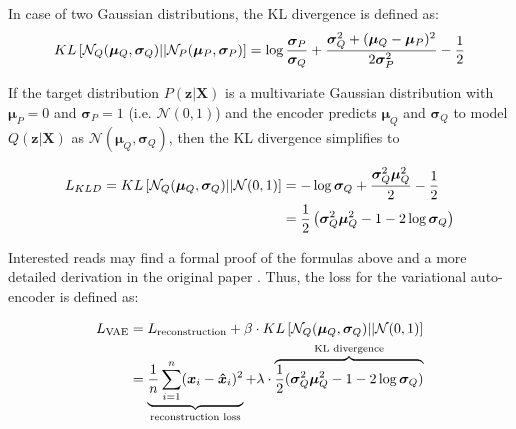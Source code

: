 In case of two Gaussian distributions, the KL divergence is defined as:
\begin{equation}\eqlbl{hso_4}
	KL\left[ \mathcal{N}_Q(\boldsymbol{\mu}_Q, \boldsymbol{\sigma}_Q)||\mathcal{N}_P(\boldsymbol{\mu}_P, \boldsymbol{\sigma}_P) \right] = \log \frac{\boldsymbol{\sigma}_P}{\boldsymbol{\sigma}_Q} + \frac{\boldsymbol{\sigma}_Q^2 + (\boldsymbol{\mu}_Q-\boldsymbol{\mu}_P)^2}{2\boldsymbol{\sigma}_P^2} - \frac{1}{2}
\end{equation}


If the target distribution $P(\boldsymbol{z}|\boldsymbol{X})$ is a multivariate Gaussian distribution with $\boldsymbol{\mu}_P = 0$ and $\boldsymbol{\sigma}_P=1$ (i.e. $\mathcal{N}(0, 1)$) and the encoder predicts $\boldsymbol{\mu}_Q$ and $\boldsymbol{\sigma}_Q$ to model $Q(\boldsymbol{z}|\boldsymbol{X})$ as $\mathcal{N}(\boldsymbol{\mu}_Q, \boldsymbol{\sigma}_Q)$, then the KL divergence simplifies to


\begin{equation*}\eqlbl{hso_5}
\begin{split}
		L_{KLD} = KL \left[ \mathcal{N}_Q(\boldsymbol{\mu}_Q, \boldsymbol{\sigma}_Q)||\mathcal{N}(0, 1) \right] & = -\log \boldsymbol{\sigma}_Q + \frac{\boldsymbol{\sigma}_Q^2 \boldsymbol{\mu}_Q^2}{2} - \frac{1}{2} \\
		 & = \frac{1}{2} \left( \boldsymbol{\sigma}_Q^2 \boldsymbol{\mu}_Q^2 - 1 - 2\log \boldsymbol{\sigma}_Q \right)
\end{split}
\end{equation*}

Interested reads may find a formal proof of the formulas above and a more detailed derivation in the original paper \cite{Kingma_Welling_2014}.
Thus, the loss for the variational auto-encoder is defined as:


\begin{equation*}\eqlbl{hso_6}
\begin{split}
		L_{\text{VAE}} & = L_{\text{reconstruction}} + \beta \cdot KL \left[ \mathcal{N}_Q(\boldsymbol{\mu}_Q, \boldsymbol{\sigma}_Q)||\mathcal{N}(0, 1) \right] \\
		  & = \underbrace{\frac{1}{n} \sum_{i=1}^{n} (\boldsymbol{x}_i - \boldsymbol{\hat{x}}_i)^2}_{\text{reconstruction loss}} + \lambda \cdot \overbrace{\frac{1}{2} (\boldsymbol{\sigma}_Q^2 \boldsymbol{\mu}_Q^2 - 1 - 2\log \boldsymbol{\sigma}_Q)}^{\text{KL divergence}}
\end{split}
\end{equation*}


